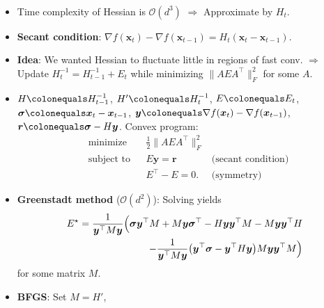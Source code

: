 \documentclass[8pt,a4paper]{extarticle}
\newcommand{\lft}{\mathopen{}\mathclose\bgroup\left}
\newcommand{\rgt}{\aftergroup\egroup\right}
\renewcommand{\vec}[1]{\bm{#1}}
\newcommand{\mat}[1]{#1}
\newenvironment{topic}[1]
{\textbf{\sffamily \colorbox{black}{\rlap{\textbf{\textcolor{white}{#1}}}\hspace{\linewidth}\hspace{-2\fboxsep}}} \\ \vspace{0.2cm}}
{}
\begin{document}
\begin{multicols*}{2}
    \begin{topic}{Quasi-Newton methods}
        \begin{itemize}
            \item Time complexity of Hessian is $\mathcal{O}(d^3)$ $\Rightarrow$ Approximate by $\mat{H}_t$.
            \item \textbf{Secant condition}: $\nabla f(\vec{x}_t) - \nabla f(\vec{x}_{t-1}) = H_t (\vec{x}_t - \vec{x}_{t-1})$.
            \item \textbf{Idea}: We wanted Hessian to fluctuate little in regions of fast conv. $\Rightarrow$ Update $\mat{H}_t^{-1} = \mat{H}_{t-1}^{-1} + \mat{E}_t$ while minimizing $\| \mat{A} \mat{E} \mat{A}^\top \|_F^2$ for some $\mat{A}$.
            \item $\mat{H} \colonequals \mat{H}_{t-1}^{-1}$, $\mat{H}' \colonequals \mat{H}_t^{-1}$, $\mat{E} \colonequals \mat{E}_t$, $\vec{\sigma} \colonequals \vec{x}_t - \vec{x}_{t-1}$, $\vec{y} \colonequals \nabla f(\vec{x}_t) - \nabla f(\vec{x}_{t-1})$, $\vec{r} \colonequals \vec{\sigma} - \mat{H} \vec{y}$. Convex program:
                  \begin{align*}
                       & \text{minimize}   &  & \frac{1}{2} \| \mat{A} \mat{E} \mat{A}^\top \|_F^2                             \\
                       & \text{subject to} &  & \mat{E} \vec{y} = \vec{r}                          & \text{(secant condition)} \\
                       &                   &  & \mat{E}^\top - \mat{E} = \mat{0}.                  & \text{(symmetry)}
                  \end{align*}
            \item \textbf{Greenstadt method} ($\mathcal{O}(d^2)$): Solving yields
                  \begin{align*}
                      \mat{E}^\star = \frac{1}{\vec{y}^\top \mat{M} \vec{y}} \Big( \vec{\sigma} \vec{y}^\top \mat{M} + \mat{M} \vec{y} \vec{\sigma}^\top - \mat{H} \vec{y} \vec{y}^\top \mat{M} - \mat{M} \vec{y} \vec{y}^\top \mat{H} & \\
                      - \frac{1}{\vec{y}^\top \mat{M} \vec{y}} \lft( \vec{y}^\top \vec{\sigma} - \vec{y}^\top \mat{H} \vec{y} \rgt) \mat{M} \vec{y} \vec{y}^\top \mat{M} \Big)                                                         &
                  \end{align*}
                  for some matrix $\mat{M}$.
            \item \textbf{BFGS}: Set $\mat{M} = \mat{H}'$, \[
\]
\end{itemize}
\end{topic}
\end{multicols*}
\end{document}
